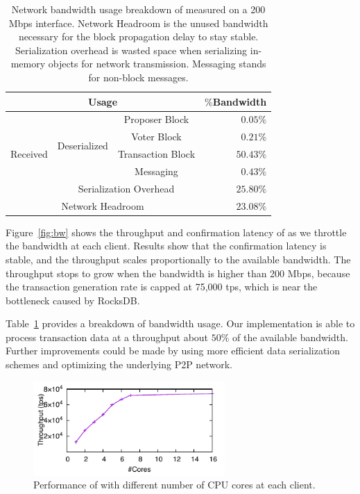 \begin{table}[ht]
\centering
    \caption[Network bandwidth usage breakdown of Prism.]{Network bandwidth usage breakdown of \prism measured on a 200 Mbps interface. Network Headroom is the unused bandwidth necessary for the block propagation delay to stay stable. Serialization overhead is wasted space when serializing in-memory objects for network transmission. Messaging stands for non-block messages.}
\begin{tabular}{| c | c | c || r |} 
 \hline
 \multicolumn{3}{|c||}{Usage} & $\%$Bandwidth \\ [0.5ex] 
 \hline\hline
 \multirow{5}{*}{Received} & \multirow{4}{*}{Deserialized} & Proposer Block & $0.05\%$ \\
 && Voter Block & $0.21\%$ \\
 && Transaction Block & $50.43\%$ \\ \cline{3-4}
 && Messaging &  $0.43\%$ \\ \cline{2-4} 
 & \multicolumn{2}{|c||}{Serialization Overhead} & $25.80\%$ \\ \hline
 \multicolumn{3}{|c||}{Network Headroom} & $23.08\%$ \\
 \hline
\end{tabular}

\label{table:bw-profiling}
\end{table}

 Figure~\ref{fig:bw} shows the throughput and confirmation latency of \prism as we throttle the bandwidth at each client. Results show that the confirmation latency is stable, and the throughput scales proportionally to the available bandwidth. The throughput stops to grow when the bandwidth is higher than 200 Mbps, because the transaction generation rate is capped at 75,000 tps, which is near the bottleneck caused by RocksDB.

Table~\ref{table:bw-profiling} provides a breakdown of bandwidth usage. Our implementation is able to process transaction data at a throughput about $50\%$ of the available bandwidth. Further improvements could be made by using more efficient data serialization schemes and optimizing the underlying P2P network.

\begin{figure}
    \centering
    \includegraphics[width=0.65\textwidth]{figures/resource-fig-cpu.pdf}
\caption{Performance of \prism with different number of CPU cores at each client.}
    \label{fig:cpu}
\end{figure}

